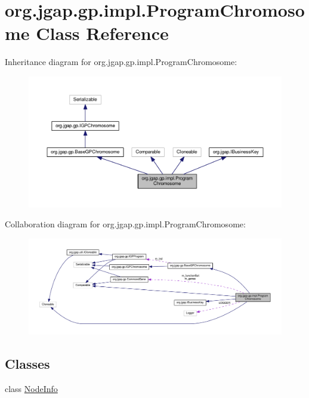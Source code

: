 \hypertarget{classorg_1_1jgap_1_1gp_1_1impl_1_1_program_chromosome}{\section{org.\-jgap.\-gp.\-impl.\-Program\-Chromosome Class Reference}
\label{classorg_1_1jgap_1_1gp_1_1impl_1_1_program_chromosome}
}


Inheritance diagram for org.\-jgap.\-gp.\-impl.\-Program\-Chromosome\-:
\nopagebreak
\begin{figure}[H]
\begin{center}
\leavevmode
\includegraphics[width=350pt]{classorg_1_1jgap_1_1gp_1_1impl_1_1_program_chromosome__inherit__graph}
\end{center}
\end{figure}


Collaboration diagram for org.\-jgap.\-gp.\-impl.\-Program\-Chromosome\-:
\nopagebreak
\begin{figure}[H]
\begin{center}
\leavevmode
\includegraphics[width=350pt]{classorg_1_1jgap_1_1gp_1_1impl_1_1_program_chromosome__coll__graph}
\end{center}
\end{figure}
\subsection*{Classes}
\begin{DoxyCompactItemize}
\item 
class \hyperlink{classorg_1_1jgap_1_1gp_1_1impl_1_1_program_chromosome_1_1_node_info}{Node\-Info}
\end{DoxyCompactItemize}
